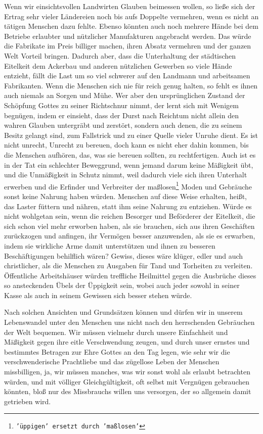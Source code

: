 {Wenn wir einsichtsvollen
Landwirten Glauben beimessen wollen, so ließe sich der
Ertrag sehr vieler Ländereien noch bis aufs Doppelte vermehren, wenn es nicht an
tätigen Menschen dazu fehlte. Ebenso könnten auch noch mehrere Hände bei dem
Betriebe erlaubter und nützlicher Manufakturen angebracht werden. Das würde die
Fabrikate im Preis billiger machen, ihren Absatz vermehren und der ganzen Welt
Vorteil bringen. Dadurch aber, dass die Unterhaltung der städtischen Eitelkeit
dem Ackerbau und anderen nützlichen Gewerben so viele Hände entzieht, fällt die
Last um so viel schwerer auf den Landmann und arbeitsamen Fabrikanten. Wenn die
Menschen sich nie für reich genug halten, so fehlt es ihnen auch niemals an
Sorgen und Mühe. Wer aber den ursprünglichen Zustand der Schöpfung Gottes zu
seiner Richtschnur nimmt, der lernt sich mit Wenigem begnügen, indem er
einsieht, dass der Durst nach Reichtum nicht allein den wahren
Glauben
untergräbt und zerstört, sondern auch denen, die zu seinem Besitz gelangt
sind, zum Fallstrick und zu einer Quelle vieler Unruhe dient. Es ist nicht
unrecht, Unrecht zu bereuen, doch kann es nicht eher dahin kommen, bis die
Menschen aufhören, das, was sie bereuen sollten, zu rechtfertigen. Auch ist es
in der Tat ein schlechter Beweggrund, wenn jemand darum keine Mäßigkeit übt,
und die Unmäßigkeit in Schutz nimmt, weil dadurch viele sich ihren Unterhalt
erwerben und die Erfinder und Verbreiter der maßlosen\footnote{\texttt{'üppigen'
ersetzt durch 'maßlosen'}} Moden und Gebräuche sonst
keine Nahrung haben würden. Menschen auf diese Weise erhalten, heißt, das Laster
füttern und nähren, statt ihm seine Nahrung zu entziehen. Würde es nicht
wohlgetan sein, wenn die reichen Besorger und Beförderer der Eitelkeit, die
sich schon viel mehr erworben haben, als sie brauchen, sich aus ihren
Geschäften
zurückzogen und anfingen, ihr Vermögen besser anzuwenden, als sie es erwarben,
indem sie wirkliche Arme damit unterstützen und ihnen zu besseren
Beschäftigungen
behilflich wären? Gewiss, dieses wäre klüger, edler und auch christlicher, als
die
Menschen zu Ausgaben für Tand und Torheiten zu verleiten. Öffentliche
Arbeitshäuser würden treffliche Heilmittel gegen die
Ausbrüche dieses so
ansteckenden Übels der Üppigkeit sein, wobei auch jeder sowohl in seiner Kasse
als auch in seinem Gewissen sich besser stehen würde.

\medskip

Nach solchen Ansichten und Grundsätzen können und dürfen wir in unserem
Lebenswandel unter den Menschen uns nicht nach den herrschenden Gebräuchen der
Welt bequemen. Wir müssen vielmehr durch unsere Einfachheit und Mäßigkeit gegen
ihre eitle Verschwendung zeugen, und durch unser ernstes und
bestimmtes Betragen
zur Ehre Gottes an den Tag legen, wie sehr wir die verschwenderische Prachtliebe
und das zügellose Leben der Menschen missbilligen, ja, wir müssen manches, was
wir sonst wohl als erlaubt betrachten würden, und mit völliger Gleichgültigkeit,
oft selbst mit Vergnügen gebrauchen könnten, bloß nur des Missbrauchs willen uns
versorgen, der so allgemein damit getrieben wird.

}

